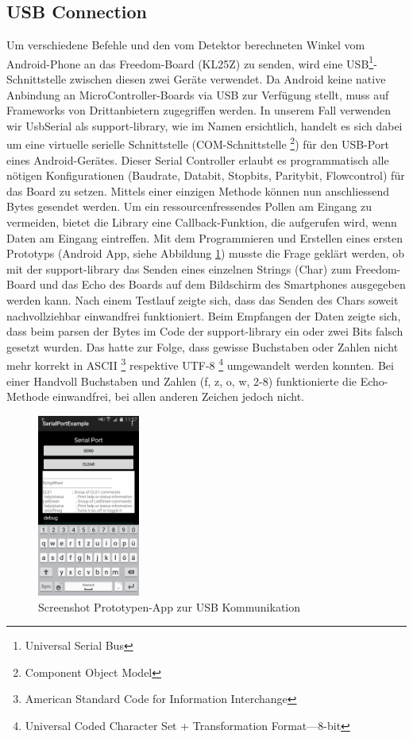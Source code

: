 \subsection{USB Connection}
Um verschiedene Befehle und den vom Detektor berechneten Winkel vom Android-Phone an das Freedom-Board (KL25Z) 
zu senden, wird eine USB\footnote{Universal Serial Bus}-Schnittstelle zwischen diesen zwei Geräte verwendet.
\newline
Da Android keine native Anbindung an MicroController-Boards via USB zur Verfügung stellt, muss auf 
Frameworks von Drittanbietern zugegriffen werden. In unserem Fall verwenden wir UsbSerial \cite{Inf:UsbSerial} als support-library, wie im Namen ersichtlich, 
handelt es sich dabei um eine virtuelle serielle Schnittstelle (COM-Schnittstelle \footnote{Component Object Model})
für den USB-Port eines Android-Gerätes. Dieser Serial Controller erlaubt es programmatisch alle nötigen Konfigurationen 
(Baudrate, Databit, Stopbits, Paritybit, Flowcontrol) für das Board zu setzen. Mittels einer einzigen 
Methode können nun anschliessend Bytes gesendet werden. Um ein ressourcenfressendes Pollen am Eingang zu vermeiden, 
bietet die Library eine Callback-Funktion, die aufgerufen wird, wenn Daten am Eingang eintreffen.
\newline
Mit dem Programmieren und Erstellen eines ersten Prototyps (Android App, siehe Abbildung \ref{abb:ScreenshotSerialPortExample}) musste die Frage geklärt werden, 
ob mit der support-library das Senden eines einzelnen Strings (Char) zum Freedom-Board und das Echo des 
Boards auf dem Bildschirm des Smartphones ausgegeben werden kann. Nach einem Testlauf zeigte sich, dass
das Senden des Chars soweit nachvollziehbar einwandfrei funktioniert. Beim Empfangen der Daten zeigte 
sich, dass beim parsen der Bytes im Code der support-library ein oder zwei Bits falsch gesetzt wurden. 
Das hatte zur Folge, dass gewisse Buchstaben oder Zahlen nicht mehr korrekt in ASCII 
\footnote{American Standard Code for Information Interchange} respektive UTF-8 
\footnote{Universal Coded Character Set + Transformation Format—8-bit}
umgewandelt werden konnten. Bei einer Handvoll Buchstaben und Zahlen (f, z, o, w, 2-8) funktionierte die
Echo-Methode einwandfrei, bei allen anderen Zeichen jedoch nicht.
\newline
\begin{figure}[h!]
	\includegraphics[width=0.3\textwidth,clip,trim=0mm 0mm 0mm 0mm]
	{Enddokumentation/Bilder/Screenshot_SerialPortExample_debug.png}
	\centering
	\caption{Screenshot Prototypen-App zur USB Kommunikation}
	\label{abb:ScreenshotSerialPortExample}
\end{figure}
